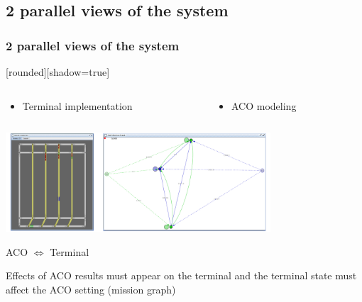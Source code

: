 \documentclass{beamer}
\begin{document}
\subsection*{2 parallel views of the system}
\begin{frame}
\frametitle{2 parallel views of the system}
	[rounded][shadow=true]
 	\begin{columns}
	 	\begin{column}[l]{6cm}
	 		\begin{itemize}
				 \item Terminal implementation
			\end{itemize}
		\end{column}
		\begin{column}[r]{6cm}
			\begin{itemize}
				  \item ACO modeling\cite{Dutot2007}
			\end{itemize}
		\end{column}
 	\end{columns}
	\begin{center} \includegraphics[height=3.7cm]{fig/terminalEtGraphe.png} \end{center}

	\begin{block}{ACO $\Longleftrightarrow$ Terminal}
		\begin{center}
			Effects of ACO results must appear on the terminal and the terminal state must affect the ACO setting (mission graph)
	 	\end{center}
	\end{block}
\end{frame}
\end{document}
